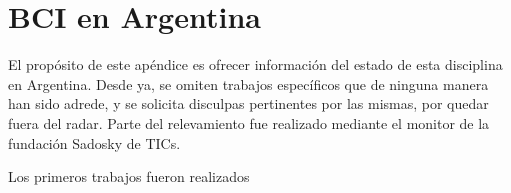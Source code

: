 \chapter{BCI en Argentina}

El propósito de este apéndice es ofrecer información del estado de esta disciplina en Argentina.  Desde ya, se omiten trabajos específicos que de ninguna manera han sido adrede, y se solicita disculpas pertinentes por las mismas, por quedar fuera del radar.  Parte del relevamiento fue realizado mediante el monitor de la fundación Sadosky de TICs.

Los primeros trabajos fueron realizados 

